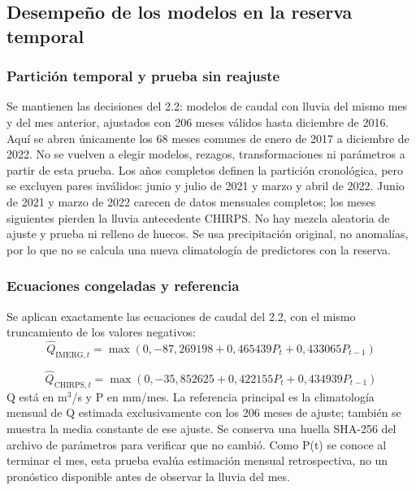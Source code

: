 \documentclass[10pt,a4paper]{article}
\begin{document}
\subsection{Desempeño de los modelos en la reserva temporal}
\subsubsection*{Partición temporal y prueba sin reajuste}
Se mantienen las decisiones del 2.2: modelos de caudal con lluvia del mismo mes y del mes anterior, ajustados con 206 meses válidos hasta diciembre de 2016. Aquí se abren únicamente los 68 meses comunes de enero de 2017 a diciembre de 2022. No se vuelven a elegir modelos, rezagos, transformaciones ni parámetros a partir de esta prueba. Los años completos definen la partición cronológica, pero se excluyen pares inválidos: junio y julio de 2021 y marzo y abril de 2022. Junio de 2021 y marzo de 2022 carecen de datos mensuales completos; los meses siguientes pierden la lluvia antecedente CHIRPS. No hay mezcla aleatoria de ajuste y prueba ni relleno de huecos. Se usa precipitación original, no anomalías, por lo que no se calcula una nueva climatología de predictores con la reserva.
\subsubsection*{Ecuaciones congeladas y referencia}
Se aplican exactamente las ecuaciones de caudal del 2.2, con el mismo truncamiento de los valores negativos:
\begin{equation}
\widehat{Q}_{\mathrm{IMERG},t}=\max\!\left(0,-87{,}269198+0{,}465439P_t+0{,}433065P_{t-1}\right)
\end{equation}

\begin{equation}
\widehat{Q}_{\mathrm{CHIRPS},t}=\max\!\left(0,-35{,}852625+0{,}422155P_t+0{,}434939P_{t-1}\right)
\end{equation}
 Q está en m$^3$/s y P en mm/mes. La referencia principal es la climatología mensual de Q estimada exclusivamente con los 206 meses de ajuste; también se muestra la media constante de ese ajuste. Se conserva una huella SHA-256 del archivo de parámetros para verificar que no cambió. Como P(t) se conoce al terminar el mes, esta prueba evalúa estimación mensual retrospectiva, no un pronóstico disponible antes de observar la lluvia del mes.
\end{document}

